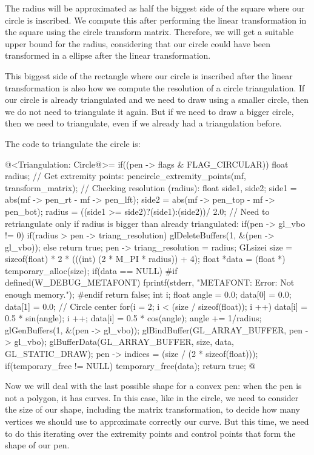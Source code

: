 {{{{{The radius will be approximated as half the biggest side of the square
where our circle is inscribed. We compute this after performing the
linear transformation in the square using the circle transform
matrix. Therefore, we will get a suitable upper bound for the radius,
considering that our circle could have been transformed in a ellipse
after the linear transformation.

This biggest side of the rectangle where our circle is inscribed after
the linear transformation is also how we compute the resolution of a
circle triangulation. If our circle is already triangulated and we
need to draw using a smaller circle, then we do not need to
triangulate it again. But if we need to draw a bigger circle, then we
need to triangulate, even if we already had a triangulation before.

The code to triangulate the circle is:

\iniciocodigo
@<Triangulation: Circle@>=
if((pen -> flags & FLAG_CIRCULAR)){
  float radius;
  // Get extremity points:
  pencircle_extremity_points(mf, transform_matrix);
  // Checking resolution (radius):
  {
    float side1, side2;
    side1 = abs(mf -> pen_rt - mf -> pen_lft);
    side2 = abs(mf -> pen_top - mf -> pen_bot);
    radius = ((side1 >= side2)?(side1):(side2))/ 2.0;
  }
  // Need to retriangulate only if radius is bigger than already triangulated:
  if(pen -> gl_vbo != 0){
    if(radius > pen -> triang_resolution)
      glDeleteBuffers(1, &(pen -> gl_vbo));
    else
      return true;
  }
  pen -> triang_resolution = radius;
  GLsizei size = sizeof(float) * 2 * (((int) (2 * M_PI * radius)) + 4);
  float *data = (float *) temporary_alloc(size);
  if(data == NULL){
#if defined(W_DEBUG_METAFONT)
    fprintf(stderr, "METAFONT: Error: Not enough memory.\n");
#endif
    return false;
  }
  {
    int i;
    float angle = 0.0;
    data[0] = 0.0;
    data[1] = 0.0; // Circle center
    for(i = 2; i < (size / sizeof(float)); i ++){
      data[i] = 0.5 * sin(angle);
      i ++;
      data[i] = 0.5 * cos(angle);
      angle += 1/radius;
    }
  }
  glGenBuffers(1, &(pen -> gl_vbo));
  glBindBuffer(GL_ARRAY_BUFFER, pen -> gl_vbo);
  glBufferData(GL_ARRAY_BUFFER, size, data, GL_STATIC_DRAW);
  pen -> indices = (size / (2 * sizeof(float)));
  if(temporary_free != NULL)
    temporary_free(data);
  return true;
}
@
\fimcodigo

Now we will deal with the last possible shape for a convex pen: when
the pen is not a polygon, it has curves. In this case, like in the
circle, we need to consider the size of our shape, including the
matrix transformation, to decide how many vertices we should use to
approximate correctly our curve. But this time, we need to do this
iterating over the extremity points and control points that form the
shape of our pen.

}}}}}
